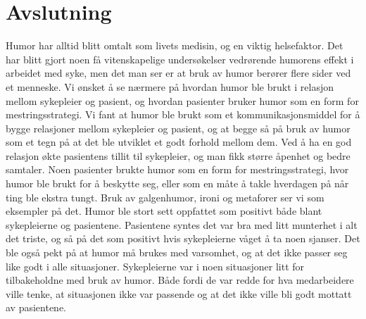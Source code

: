 \chapter{Avslutning}

Humor har alltid blitt omtalt som livets medisin, og en viktig helsefaktor. Det
har blitt gjort noen få vitenskapelige undersøkelser vedrørende humorens effekt
i arbeidet med syke, men det man ser er at bruk av humor berører flere sider
ved et menneske. Vi ønsket å se nærmere på hvordan humor ble brukt i relasjon
mellom sykepleier og pasient, og hvordan pasienter bruker humor som en form for
mestringsstrategi. Vi fant at humor ble brukt som et kommunikasjonsmiddel for å
bygge relasjoner mellom sykepleier og pasient, og at begge så på bruk av humor
som et tegn på at det ble utviklet et godt forhold mellom dem. Ved å ha en god
relasjon økte pasientens tillit til sykepleier, og man fikk større åpenhet og
bedre samtaler. Noen pasienter brukte humor som en form for mestringsstrategi,
hvor humor ble brukt for å beskytte seg, eller som en måte å takle hverdagen på
når ting ble ekstra tungt. Bruk av galgenhumor, ironi og metaforer ser vi som
eksempler på det. Humor ble stort sett oppfattet som positivt både blant
sykepleierne og pasientene. Pasientene syntes det var bra med litt munterhet i
alt det triste, og så på det som positivt hvis sykepleierne våget å ta noen
sjanser. Det ble også pekt på at humor må brukes med varsomhet, og at det ikke
passer seg like godt i alle situasjoner. Sykepleierne var i noen situasjoner
litt for tilbakeholdne med bruk av humor. Både fordi de var redde for hva
medarbeidere ville tenke, at situasjonen ikke var passende og at det ikke ville
bli godt mottatt av pasientene.
